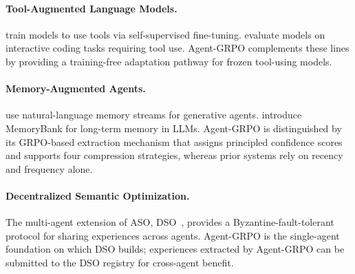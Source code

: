\paragraph{Tool-Augmented Language Models.}
\cite{schick2023toolformer} train models to use tools via self-supervised
fine-tuning. \cite{yang2024intercode} evaluate models on interactive coding
tasks requiring tool use. Agent-GRPO complements these lines by providing a
training-free adaptation pathway for frozen tool-using models.

\paragraph{Memory-Augmented Agents.}
\cite{park2023generative} use natural-language memory streams for generative
agents. \cite{zhong2024memorybank} introduce MemoryBank for long-term memory
in LLMs. Agent-GRPO is distinguished by its GRPO-based extraction mechanism
that assigns principled confidence scores and supports four compression
strategies, whereas prior systems rely on recency and frequency alone.

\paragraph{Decentralized Semantic Optimization.}
The multi-agent extension of ASO, DSO~\cite{hanzo2026dso}, provides a
Byzantine-fault-tolerant protocol for sharing experiences across agents. Agent-GRPO
is the single-agent foundation on which DSO builds; experiences extracted by
Agent-GRPO can be submitted to the DSO registry for cross-agent benefit.

